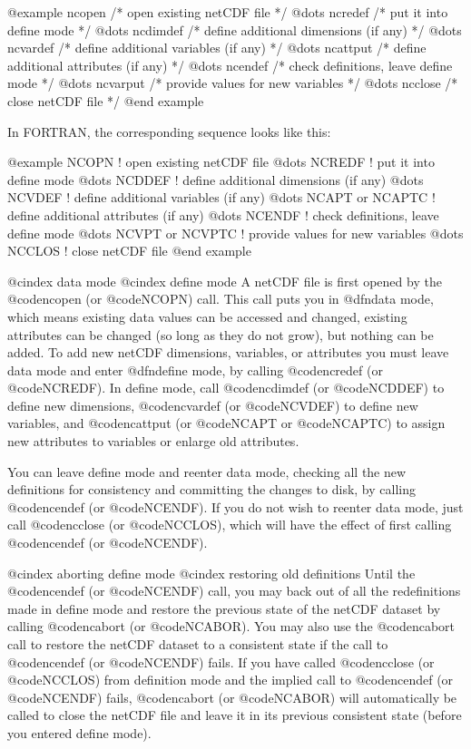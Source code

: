 @example
    ncopen           /* open existing netCDF file */
      @dots{}
    ncredef          /* put it into define mode */
        @dots{}
      ncdimdef       /* define additional dimensions (if any) */
        @dots{}
      ncvardef       /* define additional variables (if any) */
        @dots{}
      ncattput       /* define additional attributes (if any) */
        @dots{}
    ncendef          /* check definitions, leave define mode */
        @dots{}
      ncvarput       /* provide values for new variables */
        @dots{}
    ncclose          /* close netCDF file */
@end example

In FORTRAN, the corresponding sequence looks like this:

@example
    NCOPN             !  open existing netCDF file
      @dots{}
    NCREDF            !  put it into define mode
        @dots{}
      NCDDEF          !  define additional dimensions (if any)
        @dots{}
      NCVDEF          !  define additional variables (if any)
        @dots{}
      NCAPT or NCAPTC !  define additional attributes (if any)
        @dots{}
    NCENDF            !  check definitions, leave define mode
        @dots{}
      NCVPT or NCVPTC !  provide values for new variables
        @dots{}
    NCCLOS            !  close netCDF file
@end example

@cindex data mode
@cindex define mode
A netCDF file is first opened by the @code{ncopen} (or @code{NCOPN})
call.  This call puts you in @dfn{data mode}, which means existing data
values can be accessed and changed, existing attributes can be changed
(so long as they do not grow), but nothing can be added.  To add new
netCDF dimensions, variables, or attributes you must leave data mode and
enter @dfn{define mode}, by calling @code{ncredef} (or @code{NCREDF}).
In define mode, call @code{ncdimdef} (or @code{NCDDEF}) to define new
dimensions, @code{ncvardef} (or @code{NCVDEF}) to define new variables,
and @code{ncattput} (or @code{NCAPT} or
@code{NCAPTC}) to assign new attributes to variables or enlarge old
attributes.

You can leave define mode and reenter data mode, checking
all the new definitions for consistency and committing the changes to
disk, by calling @code{ncendef} (or @code{NCENDF}).  If you do not wish
to reenter data mode, just call @code{ncclose} (or @code{NCCLOS}), which
will have the effect of first calling @code{ncendef} (or @code{NCENDF}).

@cindex aborting define mode
@cindex restoring old definitions
Until the @code{ncendef} (or @code{NCENDF}) call, you may back out of
all the redefinitions made in define mode and restore the previous state
of the netCDF dataset by calling @code{ncabort} (or @code{NCABOR}).  You
may also use the @code{ncabort} call to restore the netCDF dataset to a
consistent state if the call to @code{ncendef} (or @code{NCENDF}) fails.
If you have called @code{ncclose} (or @code{NCCLOS}) from definition
mode and the implied call to @code{ncendef} (or @code{NCENDF}) fails,
@code{ncabort} (or @code{NCABOR}) will automatically be called to close
the netCDF file and leave it in its previous consistent state (before
you entered define mode).

